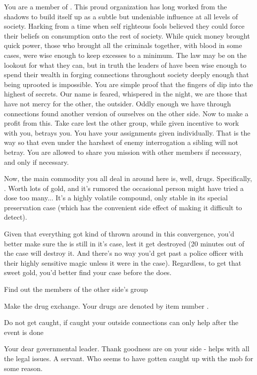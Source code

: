 \documentclass[blue]{guildcamp3}
\begin{document}
\name{\bMagicMob{}}


You are a member of \bMagicMob{}. This proud organization has long worked from the shadows to build itself up as a subtle but undeniable influence at all levels of \bMagicWorld{} society. Harking from a time when self righteous fools believed they could force their beliefs on consumption onto the rest of society. While quick money brought quick power, those who brought all the criminals together, with blood in some cases, were wise enough to keep excesses to a minimum. The law may be on the lookout for what they can, but in truth the leaders of \bMagicMob{} have been wise enough to spend their wealth in forging connections throughout society deeply enough that being uprooted is impossible. You are simple proof that the fingers of \bMagicMob{} dip into the highest of secrets. Our name is feared, whispered in the night, we are those that have not mercy for the other, the outsider. Oddly enough we have through connections found another version of ourselves on the other side. Now to make a profit from this. Take care lest the other group, while given incentive to work with you, betrays you. You have your assignments given individually. That is the way so that even under the harshest of enemy interrogation a sibling will not betray. You are allowed to share you mission with other members if necessary, and only if necessary.

Now, the main commodity you all deal in around here is, well, drugs. Specifically, \iDrugsMagic{}. Worth lots of gold, and it's rumored the occasional person might have tried a dose too many... It's a highly volatile compound, only stable in its special preservation case (which has the convenient side effect of making it difficult to detect). 

Given that everything got kind of thrown around in this convergence, you'd better make sure the \iDrugsMagic{} is still in it's case, lest it get destroyed (20 minutes out of the case will destroy it. And there's no way you'd get past a police officer with their highly sensitive magic unless it were in the case). Regardless, to get that sweet gold, you'd better find your case before the \bTechMob{} does. 

\begin{itemz}[Goals]
	\item Find out the members of the other side's group
	\item Make the drug exchange. Your drugs are denoted by item number \iDrugsMagic{}.
	\item Do not get caught, if caught your outside connections can only help after the event is done
\end{itemz}

\begin{members}
	\member{\cNobleTwo{\intro}} Your dear governmental leader. Thank goodness \cNobleTwo{\they} are on your side - helps with all the legal issues. 
	\member{\cServant{\intro}} A servant. Who seems to have gotten caught up with the mob for some reason.
		
	\end{members}
\end{document}

